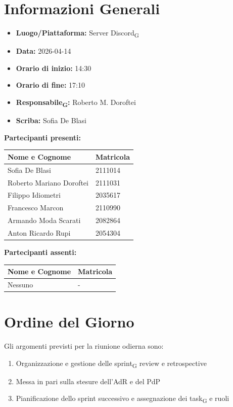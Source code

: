 \section{Informazioni Generali}
\begin{itemize}
	\item \textbf{Luogo/Piattaforma:} {Server Discord\textsubscript{G}}
	\item \textbf{Data:} 2026-04-14
	\item \textbf{Orario di inizio:} 14:30
	\item \textbf{Orario di fine:} 17:10
	\item \textbf{Responsabile\textsubscript{G}:} {Roberto M. Doroftei}
	\item \textbf{Scriba:} {Sofia De Blasi}
\end{itemize}

\vspace{0.5cm}
\textbf{Partecipanti presenti:}
\begin{table}[ht]
	\centering
	\renewcommand{\arraystretch}{1.2}
	\begin{tabularx}{\textwidth}{X l}
		\toprule
		\textbf{Nome e Cognome} & \textbf{Matricola} \\
		\midrule
		Sofia De Blasi & 2111014 \\
		Roberto Mariano Doroftei & 2111031 \\
		Filippo Idiometri & 2035617 \\
		Francesco Marcon & 2110990 \\
		Armando Moda Scarati & 2082864 \\
		Anton Ricardo Rupi & 2054304 \\
		\bottomrule
	\end{tabularx}
\end{table}

\vspace{0.5cm}
\textbf{Partecipanti assenti:}
\begin{table}[ht]
	\centering
	\renewcommand{\arraystretch}{1.2}
	\begin{tabularx}{\textwidth}{X l}
		\toprule
		\textbf{Nome e Cognome} & \textbf{Matricola} \\
		\midrule
		Nessuno & - \\
		\bottomrule
	\end{tabularx}
\end{table}

\section{Ordine del Giorno}
Gli argomenti previsti per la riunione odierna sono:
\begin{enumerate}
	\item Organizzazione e gestione delle sprint\textsubscript{G} review e retrospective
	\item Messa in pari sulla stesure dell'AdR e del PdP
	\item Pianificazione dello sprint successivo e assegnazione dei task\textsubscript{G} e ruoli
\end{enumerate}

